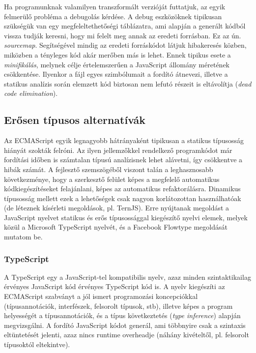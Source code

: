 Ha programunknak valamilyen transzformált verzióját futtatjuk, az egyik
felmerülő probléma a debugolás kérdése. A debug eszközöknek tipikusan szükségük
van egy megfeleltethetőségi táblázatra, ami alapján a generált kódból vissza
tudják keresni, hogy mi felelt meg annak az eredeti forrásban. Ez az ún.
\emph{sourcemap}. Segítségével mindig az eredeti forráskódot látjuk hibakeresés
közben, miközben a tényleges kód akár merőben más is lehet.  Ennek tipikus
esete a \emph{minifikálás}, melynek célje értelemszerűen a JavaScript állomány
méretének csökkentése.  Ilyenkor a fájl egyes szimbólumait a fordító átnevezi,
illetve a statikus analízis során elemzett kód biztosan nem lefutó részeit is
eltávolítja (\emph{dead code elimination}).

\subsection{Erősen típusos alternatívák}

Az ECMAScript egyik legnagyobb hátrányaként tipikusan a statikus típusosság
hiányát szokták felróni.  Az ilyen jellemzőkkel rendelkező programkódot már
fordítási időben is számtalan típusú analízisnek lehet alávetni, így csökkentve
a hibák számát.  A fejlesztő szemszögéből viszont talán a leghasznosabb
következménye, hogy a szerkesztő felület képes a megfelelő automatikus
kódkiegészítéseket felajánlani, képes az automatikus refaktorálásra.  Dinamikus
típusosság mellett ezek a lehetőségek csak nagyon korlátozottan használhatóak
(de léteznek kísérleti megoldások, pl. TernJS).  Erre nyújtanak megoldást a
JavaScript nyelvet statikus és erős típusossággal kiegészítő nyelvi elemek,
melyek közül a Microsoft TypeScript nyelvét, és a Facebook Flowtype megoldását
mutatom be.

\subsubsection{TypeScript}

A TypeScript egy a JavaScript-tel kompatibilis nyelv, azaz minden
szintaktikailag érvényes JavaScript kód érvényes TypeScript kód is.  A nyelv
kiegészíti az ECMAScript szabványt a jól ismert programozási koncepciókkal
(típusannotációk, interfészek, felsorolt típusok, stb), illetve képes a program
helyességét a típusannotációk, és a típus következtetés (\emph{type inference})
alapján megvizsgálni.
A fordító JavaScript kódot generál, ami többnyire csak a szintaxis eltüntetését jelenti, azaz nincs runtime overheadje (náhány kivételtől, pl. felsorolt típusoktól eltekintve).

